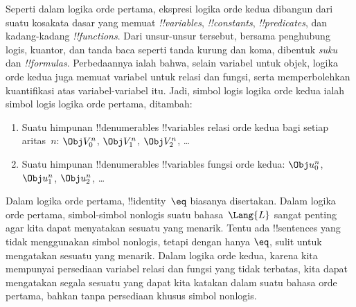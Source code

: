 \documentclass[../../../include/open-logic-section]{subfiles}
\begin{document}


Seperti dalam logika orde pertama, ekspresi logika orde kedua dibangun dari
suatu kosakata dasar yang memuat \emph{!!{variable}s},
\emph{!!{constant}s}, \emph{!!{predicate}s}, dan kadang-kadang
\emph{!!{function}s}. Dari unsur-unsur tersebut, bersama penghubung logis,
kuantor, dan tanda baca seperti tanda kurung dan koma, dibentuk \emph{suku}
dan \emph{!!{formula}s}. Perbedaannya ialah bahwa, selain variabel untuk
objek, logika orde kedua juga memuat variabel untuk relasi dan fungsi, serta
memperbolehkan kuantifikasi atas variabel-variabel itu. Jadi, simbol logis
logika orde kedua ialah simbol logis logika orde pertama, ditambah:

\begin{enumerate}
\item Suatu himpunan !!{denumerable}s !!{variable}s relasi orde kedua bagi setiap
  aritas~$n$: $\Obj V_0^n$, $\Obj V_1^n$, $\Obj V_2^n$, \dots
\item Suatu himpunan !!{denumerable}s !!{variable}s fungsi orde kedua:
  $\Obj u_0^n$, $\Obj u_1^n$, $\Obj u_2^n$, \dots
\end{enumerate}

Dalam logika orde pertama, !!{identity}~$\eq$ biasanya disertakan. Dalam
logika orde pertama, simbol-simbol nonlogis suatu bahasa~$\Lang{L}$ sangat
penting agar kita dapat menyatakan sesuatu yang menarik. Tentu ada
!!{sentence}s yang tidak menggunakan simbol nonlogis, tetapi dengan hanya
$\eq$, sulit untuk mengatakan sesuatu yang menarik. Dalam logika orde kedua,
karena kita mempunyai persediaan variabel relasi dan fungsi yang tidak
terbatas, kita dapat mengatakan segala sesuatu yang dapat kita katakan dalam
suatu bahasa orde pertama, bahkan tanpa persediaan khusus simbol nonlogis.
\end{document}
